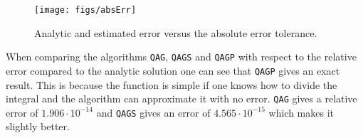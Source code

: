 \begin{figure}[H]
  \centering
  \texttt{[image: figs/absErr]}
  \caption{Analytic and estimated error versus the absolute error tolerance.}
  \label{fig:absErr}
\end{figure}

When comparing the algorithms \verb|QAG|, \verb|QAGS| and \verb|QAGP| with respect to the relative error compared to the analytic solution one can see that \verb|QAGP| gives an exact result. This is because the function is simple if one knows how to divide the integral and the algorithm can approximate it with no error. \verb|QAG| gives a relative error of $1.906 \cdot 10^{-14}$ and \verb|QAGS| gives an error of $4.565 \cdot 10^{-15}$ which makes it slightly better.
